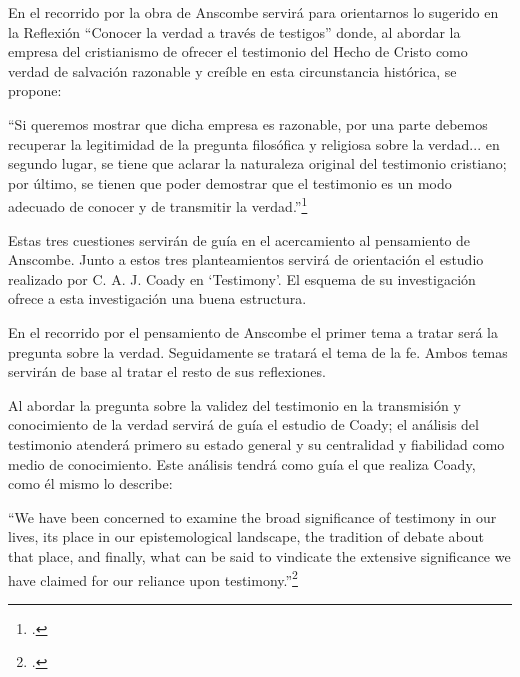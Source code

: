\documentclass[12pt]{article}
\begin{document}
{En el recorrido por la obra de Anscombe servirá para orientarnos lo sugerido en la Reflexión ``Conocer la verdad a través de testigos'' donde, al abordar la empresa del cristianismo de ofrecer el testimonio del Hecho de Cristo como verdad de salvación razonable y creíble en esta circunstancia histórica, se propone:

``Si queremos mostrar que dicha empresa es razonable, por una parte debemos recuperar la legitimidad de la pregunta filosófica y religiosa sobre la verdad... en segundo lugar, se tiene que aclarar la naturaleza original del testimonio cristiano; por último, se tienen que poder demostrar que el testimonio es un modo adecuado de conocer y de transmitir la verdad.''\footcite[267]{pradesmulticr}

Estas tres cuestiones servirán de guía en el acercamiento al pensamiento de Anscombe. Junto a estos tres planteamientos servirá de orientación el estudio realizado por C. A. J. Coady en `Testimony'. El esquema de su investigación ofrece a esta investigación una buena estructura.  

En el recorrido por el pensamiento de Anscombe el primer tema a tratar será la pregunta sobre la verdad. Seguidamente se tratará el tema de la fe. Ambos temas servirán de base al tratar el resto de sus reflexiones.

Al abordar la pregunta sobre la validez del testimonio en la transmisión y conocimiento de la verdad servirá de guía el estudio de Coady; el análisis del testimonio atenderá primero su estado general y su centralidad y fiabilidad como medio de conocimiento. Este análisis tendrá como guía el que realiza Coady, como él mismo lo describe:

``We have been concerned to examine the broad significance of testimony in our lives, its place in our epistemological landscape, the tradition of debate about that place, and finally, what can be said to vindicate the extensive significance we have claimed for our reliance upon testimony.''\footcite[175]{testcoady}

}
\end{document}
